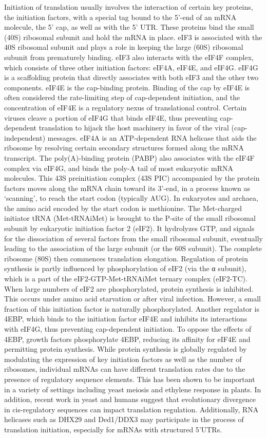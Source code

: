 Initiation of translation usually involves the interaction of certain key proteins, the initiation factors, with a special tag bound to the 5'-end of an mRNA molecule, the 5' cap, as well as with the 5' UTR. These proteins bind the small (40S) ribosomal subunit and hold the mRNA in place. eIF3 is associated with the 40S ribosomal subunit and plays a role in keeping the large (60S) ribosomal subunit from prematurely binding. eIF3 also interacts with the eIF4F complex, which consists of three other initiation factors: eIF4A, eIF4E, and eIF4G. eIF4G is a scaffolding protein that directly associates with both eIF3 and the other two components. eIF4E is the cap-binding protein. Binding of the cap by eIF4E is often considered the rate-limiting step of cap-dependent initiation, and the concentration of eIF4E is a regulatory nexus of translational control. Certain viruses cleave a portion of eIF4G that binds eIF4E, thus preventing cap-dependent translation to hijack the host machinery in favor of the viral (cap-independent) messages. eIF4A is an ATP-dependent RNA helicase that aids the ribosome by resolving certain secondary structures formed along the mRNA transcript. The poly(A)-binding protein (PABP) also associates with the eIF4F complex via eIF4G, and binds the poly-A tail of most eukaryotic mRNA molecules. This 43S preinitiation complex (43S PIC) accompanied by the protein factors moves along the mRNA chain toward its 3'-end, in a process known as `scanning', to reach the start codon (typically AUG). In eukaryotes and archaea, the amino acid encoded by the start codon is methionine. The Met-charged initiator tRNA (Met-tRNAiMet) is brought to the P-site of the small ribosomal subunit by eukaryotic initiation factor 2 (eIF2). It hydrolyzes GTP, and signals for the dissociation of several factors from the small ribosomal subunit, eventually leading to the association of the large subunit (or the 60S subunit). The complete ribosome (80S) then commences translation elongation. Regulation of protein synthesis is partly influenced by phosphorylation of eIF2 (via the α subunit), which is a part of the eIF2-GTP-Met-tRNAiMet ternary complex (eIF2-TC). When large numbers of eIF2 are phosphorylated, protein synthesis is inhibited. This occurs under amino acid starvation or after viral infection. However, a small fraction of this initiation factor is naturally phosphorylated. Another regulator is 4EBP, which binds to the initiation factor eIF4E and inhibits its interactions with eIF4G, thus preventing cap-dependent initiation. To oppose the effects of 4EBP, growth factors phosphorylate 4EBP, reducing its affinity for eIF4E and permitting protein synthesis. While protein synthesis is globally regulated by modulating the expression of key initiation factors as well as the number of ribosomes, individual mRNAs can have different translation rates due to the presence of regulatory sequence elements. This has been shown to be important in a variety of settings including yeast meiosis and ethylene response in plants. In addition, recent work in yeast and humans suggest that evolutionary divergence in cis-regulatory sequences can impact translation regulation. Additionally, RNA helicases such as DHX29 and Ded1/DDX3 may participate in the process of translation initiation, especially for mRNAs with structured 5'UTRs.

